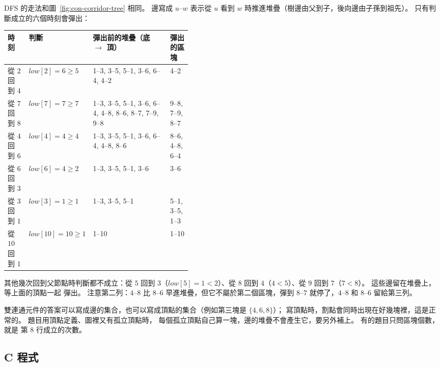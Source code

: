 DFS 的走法和圖~\ref{fig:con-corridor-tree} 相同。 邊寫成 $u$--$w$ 表示從 $u$ 看到 $w$
時推進堆疊（樹邊由父到子，後向邊由子孫到祖先）。 只有判斷成立的六個時刻會彈出：

\begin{center}
\small
\setlength{\tabcolsep}{4pt}
\begin{tabular}{ll>{\raggedright\arraybackslash}p{0.42\linewidth}l}
\toprule
時刻 & 判斷 & 彈出前的堆疊（底 $\to$ 頂） & 彈出的區塊 \\
\midrule
從 $2$ 回到 $4$ & $\mathit{low}[2] = 6 \ge 5$ & \mbox{1--3}, \mbox{3--5}, \mbox{5--1}, \mbox{3--6}, \mbox{6--4}, \mbox{4--2} & \mbox{4--2} \\
從 $7$ 回到 $8$ & $\mathit{low}[7] = 7 \ge 7$ & \mbox{1--3}, \mbox{3--5}, \mbox{5--1}, \mbox{3--6}, \mbox{6--4}, \mbox{4--8}, \mbox{8--6}, \mbox{8--7}, \mbox{7--9}, \mbox{9--8} & \mbox{9--8}, \mbox{7--9}, \mbox{8--7} \\
從 $4$ 回到 $6$ & $\mathit{low}[4] = 4 \ge 4$ & \mbox{1--3}, \mbox{3--5}, \mbox{5--1}, \mbox{3--6}, \mbox{6--4}, \mbox{4--8}, \mbox{8--6} & \mbox{8--6}, \mbox{4--8}, \mbox{6--4} \\
從 $6$ 回到 $3$ & $\mathit{low}[6] = 4 \ge 2$ & \mbox{1--3}, \mbox{3--5}, \mbox{5--1}, \mbox{3--6} & \mbox{3--6} \\
從 $3$ 回到 $1$ & $\mathit{low}[3] = 1 \ge 1$ & \mbox{1--3}, \mbox{3--5}, \mbox{5--1} & \mbox{5--1}, \mbox{3--5}, \mbox{1--3} \\
從 $10$ 回到 $1$ & $\mathit{low}[10] = 10 \ge 1$ & \mbox{1--10} & \mbox{1--10} \\
\bottomrule
\end{tabular}
\end{center}

其他幾次回到父節點時判斷都不成立：從 $5$ 回到 $3$（$\mathit{low}[5] = 1 < 2$）、從 $8$
回到 $4$（$4 < 5$）、從 $9$ 回到 $7$（$7 < 8$）。 這些邊留在堆疊上，等上面的頂點一起
彈出。 注意第二列：$4$--$8$ 比 $8$--$6$ 早進堆疊，但它不屬於第二個區塊，彈到 $8$--$7$
就停了，$4$--$8$ 和 $8$--$6$ 留給第三列。

\begin{examnote}
雙連通元件的答案可以寫成邊的集合，也可以寫成頂點的集合（例如第三塊是 $\{4, 6, 8\}$）；
寫頂點時，割點會同時出現在好幾塊裡，這是正常的。 題目用頂點定義、圖裡又有孤立頂點時，
每個孤立頂點自己算一塊，邊的堆疊不會產生它，要另外補上。 有的題目只問區塊個數，就是
第 8 行成立的次數。
\end{examnote}

\subsection{C 程式}

